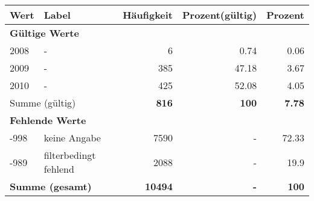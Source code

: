      \begin{longtable}{lXrrr}
     \toprule
     \textbf{Wert} & \textbf{Label} & \textbf{Häufigkeit} & \textbf{Prozent(gültig)} & \textbf{Prozent} \\
     \endhead
     \midrule
     \multicolumn{5}{l}{\textbf{Gültige Werte}}\\

     2008 &
     \multicolumn{1}{X}{ -  } &


       \num{6} &
       \num[round-mode=places,round-precision=2]{0,74} &
         \num[round-mode=places,round-precision=2]{0,06} \\

     2009 &
     \multicolumn{1}{X}{ -  } &


       \num{385} &
       \num[round-mode=places,round-precision=2]{47,18} &
         \num[round-mode=places,round-precision=2]{3,67} \\

     2010 &
     \multicolumn{1}{X}{ -  } &


       \num{425} &
       \num[round-mode=places,round-precision=2]{52,08} &
         \num[round-mode=places,round-precision=2]{4,05} \\
     \midrule
     \multicolumn{2}{l}{Summe (gültig)} &
       \textbf{\num{816}} &
     \textbf{100} &
       \textbf{\num[round-mode=places,round-precision=2]{7,78}} \\
     \multicolumn{5}{l}{\textbf{Fehlende Werte}}\\
       -998 &
       keine Angabe &
         \num{7590} &
        - &
         \num[round-mode=places,round-precision=2]{72,33} \\
       -989 &
       filterbedingt fehlend &
         \num{2088} &
        - &
         \num[round-mode=places,round-precision=2]{19,9} \\
     \midrule
     \multicolumn{2}{l}{\textbf{Summe (gesamt)}} &
          \textbf{\num{10494}} &
        \textbf{-} &
        \textbf{100} \\
     \bottomrule
     \end{longtable}
     
